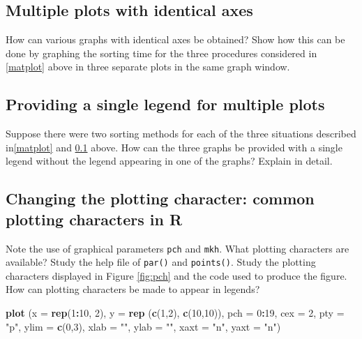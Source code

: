 \documentclass[
]{book}
\newenvironment{Shaded}{\begin{snugshade}}{\end{snugshade}}
\newcommand{\AttributeTok}[1]{\textcolor[rgb]{0.13,0.29,0.53}{#1}}
\newcommand{\DecValTok}[1]{\textcolor[rgb]{0.00,0.00,0.81}{#1}}
\newcommand{\FunctionTok}[1]{\textcolor[rgb]{0.13,0.29,0.53}{\textbf{#1}}}
\newcommand{\NormalTok}[1]{#1}
\newcommand{\SpecialCharTok}[1]{\textcolor[rgb]{0.81,0.36,0.00}{\textbf{#1}}}
\newcommand{\StringTok}[1]{\textcolor[rgb]{0.31,0.60,0.02}{#1}}
\begin{document}
\subsection{Multiple plots with identical axes}\label{multAxes}

How can various graphs with identical axes be obtained? Show how this can be done by graphing the sorting time for the three procedures considered in \ref{matplot} above in three separate plots in the same graph window.

\subsection{Providing a single legend for multiple plots}\label{providing-a-single-legend-for-multiple-plots}

Suppose there were two sorting methods for each of the three situations described in\ref{matplot} and \ref{multAxes} above. How can the three graphs be provided with a single legend without the legend appearing in one of the graphs? Explain in detail.

\subsection{Changing the plotting character: common plotting characters in R}\label{changing-the-plotting-character-common-plotting-characters-in-r}

Note the use of graphical parameters \texttt{pch} and \texttt{mkh}. What plotting characters are available? Study the help file of \texttt{par()} and \texttt{points()}. Study the plotting characters displayed in Figure \ref{fig:pch} and the code used to produce the figure. How can plotting characters be made to appear in legends?

\begin{Shaded}
\begin{Highlighting}[]
\FunctionTok{plot}\NormalTok{ (}\AttributeTok{x =} \FunctionTok{rep}\NormalTok{(}\DecValTok{1}\SpecialCharTok{:}\DecValTok{10}\NormalTok{, }\DecValTok{2}\NormalTok{), }\AttributeTok{y =} \FunctionTok{rep}\NormalTok{ (}\FunctionTok{c}\NormalTok{(}\DecValTok{1}\NormalTok{,}\DecValTok{2}\NormalTok{), }\FunctionTok{c}\NormalTok{(}\DecValTok{10}\NormalTok{,}\DecValTok{10}\NormalTok{)), }\AttributeTok{pch =} \DecValTok{0}\SpecialCharTok{:}\DecValTok{19}\NormalTok{, }\AttributeTok{cex =} \DecValTok{2}\NormalTok{, }
      \AttributeTok{pty =} \StringTok{"p"}\NormalTok{, }\AttributeTok{ylim =} \FunctionTok{c}\NormalTok{(}\DecValTok{0}\NormalTok{,}\DecValTok{3}\NormalTok{), }\AttributeTok{xlab =} \StringTok{""}\NormalTok{, }\AttributeTok{ylab =} \StringTok{""}\NormalTok{, }\AttributeTok{xaxt =} \StringTok{"n"}\NormalTok{, }\AttributeTok{yaxt =} \StringTok{"n"}\NormalTok{)}
\end{Highlighting}
\end{Shaded}
\end{document}
